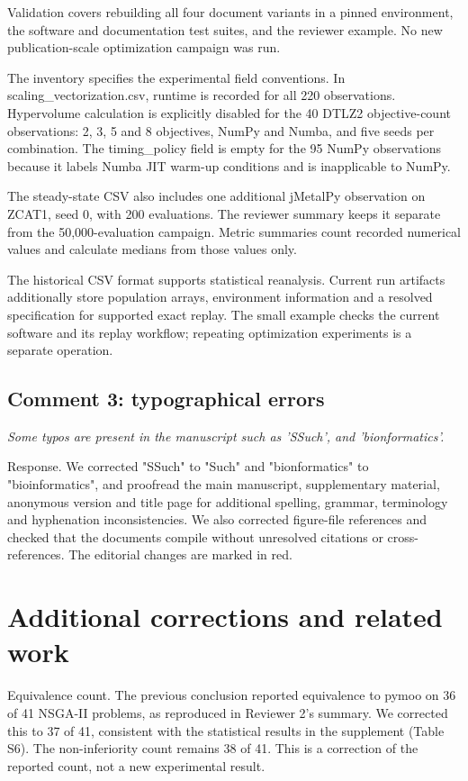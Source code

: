 \documentclass[11pt,letterpaper]{article}
\newcommand{\response}[1]{{\color{response}#1}\par}
\newcommand{\reviewercomment}[1]{{\itshape #1}\par}
\begin{document}
\response{Validation covers rebuilding all four document variants in a pinned environment, the software and documentation test suites, and the reviewer example. No new publication-scale optimization campaign was run.}

\response{The inventory specifies the experimental field conventions. In scaling\_vectorization.csv, runtime is recorded for all 220 observations. Hypervolume calculation is explicitly disabled for the 40 DTLZ2 objective-count observations: 2, 3, 5 and 8 objectives, NumPy and Numba, and five seeds per combination. The timing\_policy field is empty for the 95 NumPy observations because it labels Numba JIT warm-up conditions and is inapplicable to NumPy.}

\response{The steady-state CSV also includes one additional jMetalPy observation on ZCAT1, seed 0, with 200 evaluations. The reviewer summary keeps it separate from the 50,000-evaluation campaign. Metric summaries count recorded numerical values and calculate medians from those values only.}

\response{The historical CSV format supports statistical reanalysis. Current run artifacts additionally store population arrays, environment information and a resolved specification for supported exact replay. The small example checks the current software and its replay workflow; repeating optimization experiments is a separate operation.}

\subsection*{Comment 3: typographical errors}

\reviewercomment{Some typos are present in the manuscript such as 'SSuch', and 'bionformatics'.}

\response{Response. We corrected "SSuch" to "Such" and "bionformatics" to "bioinformatics", and proofread the main manuscript, supplementary material, anonymous version and title page for additional spelling, grammar, terminology and hyphenation inconsistencies. We also corrected figure-file references and checked that the documents compile without unresolved citations or cross-references. The editorial changes are marked in red.}

\newpage
\section*{Additional corrections and related work}

\response{Equivalence count. The previous conclusion reported equivalence to pymoo on 36 of 41 NSGA-II problems, as reproduced in Reviewer 2's summary. We corrected this to 37 of 41, consistent with the statistical results in the supplement (Table S6). The non-inferiority count remains 38 of 41. This is a correction of the reported count, not a new experimental result.}
\end{document}
